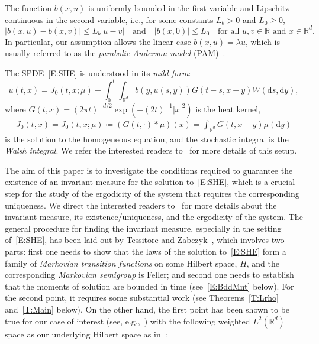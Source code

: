 \documentclass[a4paper,11pt]{article}%
\theoremstyle{plain}
\theoremstyle{definition}
\numberwithin{equation}{section}
\newcommand{\R}{\mathbb{R}}
\newcommand{\ud}{\ensuremath{\mathrm{d}}}
\begin{document}
The function $b(x,u)$ is uniformly bounded in the first variable and Lipschitz continuous in the
second variable, i.e., for some constants $L_b>0$ and $L_0\ge 0$,
\begin{equation}\label{E:lipcon}
  |b(x,u)-b(x,v)| \le L_b |u-v| \quad \text{and} \quad
  |b(x,0)|        \le L_0       \quad \text{for all $u,v \in \R$ and $x \in \R^d.$ }
\end{equation}
In particular, our assumption allows the linear case $b(x,u) = \lambda u$, which is usually referred
to as the \textit{parabolic Anderson model} (PAM)~\cite{carmona.molchanov:94:parabolic}.

The SPDE~\eqref{E:SHE} is understood in its \textit{mild form}:
\begin{equation}\label{E:gmsol}
  u(t,x) = J_0(t,x;\mu)+ \int_0^t\int_{\R^d}b(y,u(s,y))G(t-s,x-y)W(\ud s,\ud y),
\end{equation}
where $G(t,x) = (2 \pi t)^{-d/2}\exp\left(-\left(2t\right)^{-1}|x|^2\right)$ is the heat kernel,
\begin{gather}\label{E:Ju}
   J_0(t,x) = J_0(t,x;\mu) \coloneqq (G(t,\cdot) * \mu)(x) = \int_{\R^d} G(t,x-y) \mu(\ud y)
\end{gather}
is the solution to the homogeneous equation, and the stochastic integral is the \textit{Walsh
integral}. We refer the interested readers
to~\cite{chen.kim:19:nonlinear,dalang.khoshnevisan.ea:09:minicourse,dalang:99:extending,walsh:86:introduction}
for more details of this setup. \bigskip

The aim of this paper is to investigate the conditions required to guarantee the existence of an
invariant measure for the solution to~\eqref{E:SHE}, which is a crucial step for the study of the
ergodicity of the system that requires the corresponding uniqueness. We direct the interested
readers to~\cite{cerrai:01:second,da-prato.zabczyk:96:ergodicity, da-prato.zabczyk:14:stochastic}
for more details about the invariant measure, its existence/uniqueness, and the ergodicity of the
system. The general procedure for finding the invariant measure, especially in the setting
of~\eqref{E:SHE}, has been laid out by Tessitore and Zabczyk~\cite{tessitore.zabczyk:98:invariant},
which involves two parts: first one needs to show that the laws of the solution to~\eqref{E:SHE}
form a family of \emph{Markovian transition functions} on some Hilbert space, $H$, and the
corresponding \emph{Markovian semigroup} is Feller; and second one needs to establish that the
moments of solution are bounded in time (see~\eqref{E:BddMnt} below). For the second point, it
requires some substantial work (see Theorems~\ref{T:Lrho} and~\ref{T:Main} below). On the other
hand, the first point has been shown to be true for our case of interest (see, e.g.,~\cite[Chapter
9]{da-prato.zabczyk:14:stochastic}) with the following weighted $L^2 (\R^d)$ space as our underlying
Hilbert space as in~\cite{tessitore.zabczyk:98:invariant}:
\end{document}
